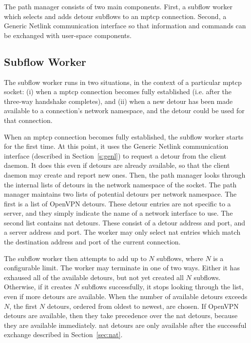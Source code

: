 \documentclass{cwru}
\begin{document}
The path manager consists of two main components. First, a subflow worker which
selects and adds detour subflows to an \ac{mptcp} connection. Second, a Generic
Netlink communication interface so that information and commands can be
exchanged with user-space components.

\subsection{Subflow Worker}

The subflow worker runs in two situations, in the context of a particular
\ac{mptcp} socket: (i) when a \ac{mptcp} connection becomes fully established
(i.e. after the three-way handshake completes), and (ii) when a new detour has
been made available to a connection's network namespace, and the detour could be
used for that connection.

When an \ac{mptcp} connection becomes fully established, the subflow worker
starts for the first time. At this point, it uses the Generic Netlink
communication interface (described in Section~\ref{s:genl}) to request a detour
from the client daemon. It does this even if detours are already available, so
that the client daemon may create and report new ones. Then, the path manager
looks through the internal lists of detours in the network namespace of the
socket. The path manager maintains two lists of potential detours per network
namespace. The first is a list of OpenVPN detours. These detour entries are not
specific to a server, and they simply indicate the name of a network interface
to use. The second list contains \ac{nat} detours. These consist of a detour
address and port, and a server address and port. The worker may only select
\ac{nat} entries which match the destination address and port of the current
connection.

The subflow worker then attempts to add up to $N$ subflows, where $N$ is a
configurable limit. The worker may terminate in one of two ways. Either it has
exhaused all of the available detours, but not yet created all $N$ subflows.
Otherwise, if it creates $N$ subflows successfully, it stops looking through the
list, even if more detours are available. When the number of available detours
exceeds $N$, the first $N$ detours, ordered from oldest to newest, are chosen.
If OpenVPN detours are available, then they take precedence over the \ac{nat}
detours, because they are available immediately. \ac{nat} detours are only
available after the successful exchange described in Section~\ref{sec:nat}.
\end{document}
